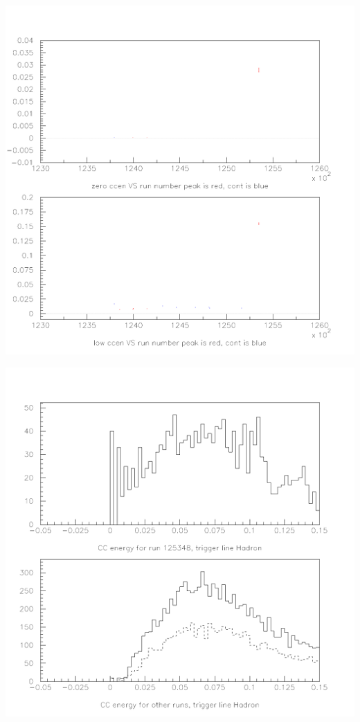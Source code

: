 \documentclass[landscape]{article}
\begin{document}
\begin{center}
  \includegraphics[height=\textheight]{tr2_nether_v_run.pdf}
\end{center}

\begin{center}
  \includegraphics[height=\textheight]{tr2_nether_hadron.pdf}
\end{center}
\end{document}
